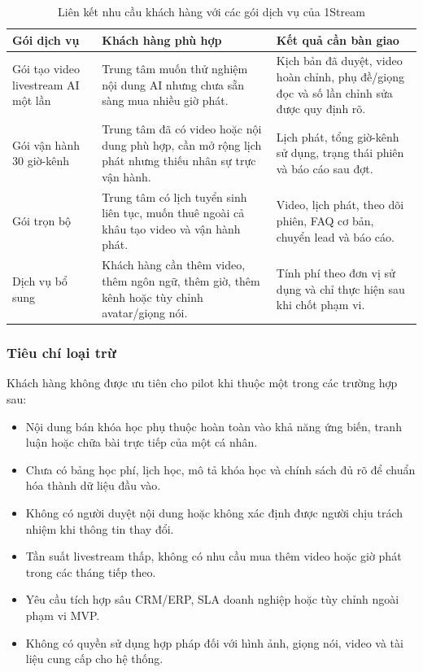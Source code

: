 \begin{table}[H]
    \centering
    \small
    \setlength{\tabcolsep}{4pt}
    \renewcommand{\arraystretch}{1.25}
    \caption{Liên kết nhu cầu khách hàng với các gói dịch vụ của 1Stream}
    \label{tab:package-fit-1stream}
    \begin{tabularx}{\linewidth}{@{}L{3.0cm}Y Y@{}}
        \toprule
        \textbf{Gói dịch vụ} & \textbf{Khách hàng phù hợp} & \textbf{Kết quả cần bàn giao} \\ \midrule
        Gói tạo video livestream AI một lần & Trung tâm muốn thử nghiệm nội dung
        AI nhưng chưa sẵn sàng mua nhiều giờ phát. &
        Kịch bản đã duyệt, video hoàn chỉnh, phụ đề/giọng đọc và số lần chỉnh sửa
        được quy định rõ. \\
        Gói vận hành 30 giờ-kênh & Trung tâm đã có video hoặc nội dung phù hợp,
        cần mở rộng lịch phát nhưng thiếu nhân sự trực vận hành. &
        Lịch phát, tổng giờ-kênh sử dụng, trạng thái phiên và báo cáo sau đợt. \\
        Gói trọn bộ & Trung tâm có lịch tuyển sinh liên tục, muốn thuê ngoài cả
        khâu tạo video và vận hành phát. &
        Video, lịch phát, theo dõi phiên, FAQ cơ bản, chuyển lead và báo cáo. \\
        Dịch vụ bổ sung & Khách hàng cần thêm video, thêm ngôn ngữ, thêm giờ,
        thêm kênh hoặc tùy chỉnh avatar/giọng nói. &
        Tính phí theo đơn vị sử dụng và chỉ thực hiện sau khi chốt phạm vi. \\ \bottomrule
    \end{tabularx}
\end{table}

\subsubsection{Tiêu chí loại trừ}

Khách hàng không được ưu tiên cho pilot khi thuộc một trong các trường hợp sau:
\begin{itemize}
    \item Nội dung bán khóa học phụ thuộc hoàn toàn vào khả năng ứng biến, tranh luận hoặc chữa bài trực tiếp của một cá nhân.
    \item Chưa có bảng học phí, lịch học, mô tả khóa học và chính sách đủ rõ để chuẩn hóa thành dữ liệu đầu vào.
    \item Không có người duyệt nội dung hoặc không xác định được người chịu trách nhiệm khi thông tin thay đổi.
    \item Tần suất livestream thấp, không có nhu cầu mua thêm video hoặc giờ phát trong các tháng tiếp theo.
    \item Yêu cầu tích hợp sâu CRM/ERP, SLA doanh nghiệp hoặc tùy chỉnh ngoài phạm vi MVP.
    \item Không có quyền sử dụng hợp pháp đối với hình ảnh, giọng nói, video và tài liệu cung cấp cho hệ thống.
\end{itemize}

